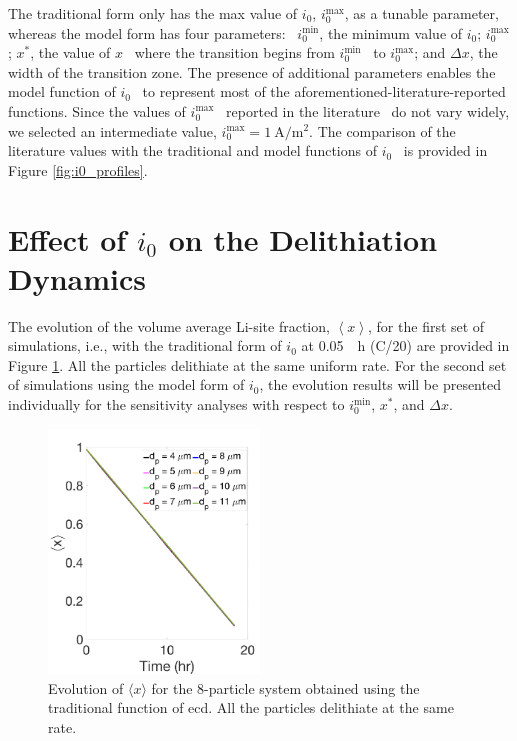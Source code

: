 \documentclass{article}
\begin{document}
The traditional form only has the max value of $i_0$,
$i_0^{\mathrm{max}}$, as a tunable parameter, whereas the model form
has four parameters: \ $i_0^{\mathrm{min}}$, the minimum value of
$i_0$; $i_0^{\mathrm{max}}$; $x^{\ast }$, the value of $x$ \ where the
transition begins from $i_0^{\mathrm{min}}$ \ to $i_0^{\mathrm{max}}$;
and $\Delta x$, the width of the transition zone. The presence of additional
parameters enables the model function of $i_0$ \ to represent most of
the aforementioned-literature-reported functions. Since the values of
$i_0^{\mathrm{max}}$ \ reported in the %
literature\cite{tsai2018,dees2008} \ do not vary widely, we selected
an intermediate value,
$i_0^{\mathrm{max}}=\SI{1}{\ampere\per\meter\squared}$. The comparison
of the literature values with the traditional and model functions of
$i_0$ \ is provided in Figure \ref{fig:i0_profiles}.

\section{Effect of $i_0$ on the Delithiation Dynamics}

The evolution of the volume average Li-site fraction, $\left\langle
x\right\rangle $, for the first set of simulations, i.e., with the
traditional form of $i_0$ at \SI{0.05}{\per\hour} (C/20) are provided
in Figure \ref{fig:x-evolution}. All the particles delithiate at the
same uniform rate. For the second set of simulations using the model
form of $i_0$, the evolution results will be presented individually
for the sensitivity analyses with respect to $i_0^{\mathrm{min}}$,
$x^{\ast}$, and $\Delta x$.

\begin{figure}
  \includegraphics[width=0.5\textwidth]{8-particle-evolution.pdf}
  \caption{Evolution of $\langle x \rangle$ for the 8-particle system
    obtained using the traditional function of \gls{ecd}. All the
    particles delithiate at the same rate.}
  \label{fig:x-evolution}
\end{figure}
\end{document}
